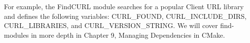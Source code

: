 For example, the FindCURL module searches for a popular Client URL library and defines the following variables: CURL\_FOUND, CURL\_INCLUDE\_DIRS, CURL\_LIBRARIES, and CURL\_VERSION\_STRING.
We will cover find-modules in more depth in Chapter 9, Managing Dependencies in CMake.







































